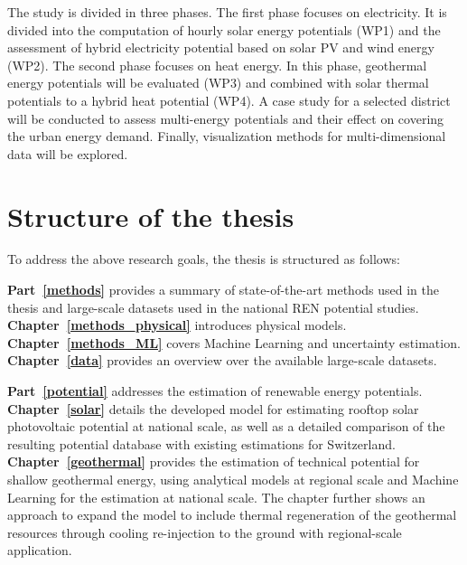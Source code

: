 The study is divided in three phases. The first phase focuses on electricity. It is divided into the computation of hourly solar energy potentials (WP1) and the assessment of hybrid electricity potential based on solar PV and wind energy (WP2). The second phase focuses on heat energy. In this phase, geothermal energy potentials will be evaluated (WP3) and combined with solar thermal potentials to a hybrid heat potential (WP4). A case study for a selected district will be conducted to assess multi-energy potentials and their effect on covering the urban energy demand. Finally, visualization methods for multi-dimensional data will be explored. 


\section{Structure of the thesis}
To address the above research goals, the thesis is structured as follows:

\textbf{Part~\ref{methods}} provides a summary of state-of-the-art methods used in the thesis and large-scale  datasets used in the national REN potential studies. \textbf{Chapter~\ref{methods_physical}} introduces physical models. \textbf{Chapter~\ref{methods_ML}} covers Machine Learning and uncertainty estimation.  \textbf{Chapter~\ref{data}} provides an overview over the available large-scale datasets.

\textbf{Part~\ref{potential} }addresses the estimation of renewable energy potentials. \textbf{Chapter~\ref{solar} }details the developed model for estimating rooftop solar photovoltaic potential at national scale, as well as a detailed comparison of the resulting potential database with existing estimations for Switzerland. \textbf{Chapter~\ref{geothermal}} provides the estimation of technical potential for shallow geothermal energy, using analytical models at regional scale and Machine Learning for the estimation at national scale. The chapter further shows an approach to expand the model to include thermal regeneration of the geothermal resources through cooling re-injection to the ground with regional-scale application.

